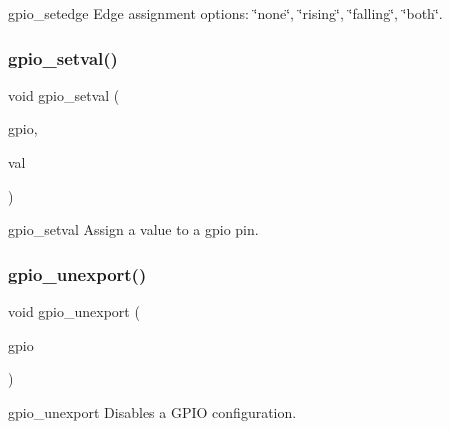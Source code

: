 gpio\+\_\+setedge Edge assignment options\+: \char`\"{}none\char`\"{}, \char`\"{}rising\char`\"{}, \char`\"{}falling\char`\"{}, \char`\"{}both\char`\"{}. \mbox{\label{gpio_8h_a11ab695374d8ee44aee0cb14dece82ce}} 
\subsubsection{gpio\+\_\+setval()}
{\footnotesize\ttfamily void gpio\+\_\+setval (\begin{DoxyParamCaption}\item[{uint}]{gpio,  }\item[{enum \textbf{ P\+I\+N\+\_\+\+V\+AL}}]{val }\end{DoxyParamCaption})}

gpio\+\_\+setval Assign a value to a gpio pin. \mbox{\label{gpio_8h_abbbd59c075ac8502be7652339e0d6365}} 
\subsubsection{gpio\+\_\+unexport()}
{\footnotesize\ttfamily void gpio\+\_\+unexport (\begin{DoxyParamCaption}\item[{uint}]{gpio }\end{DoxyParamCaption})}

gpio\+\_\+unexport Disables a G\+P\+IO configuration. 